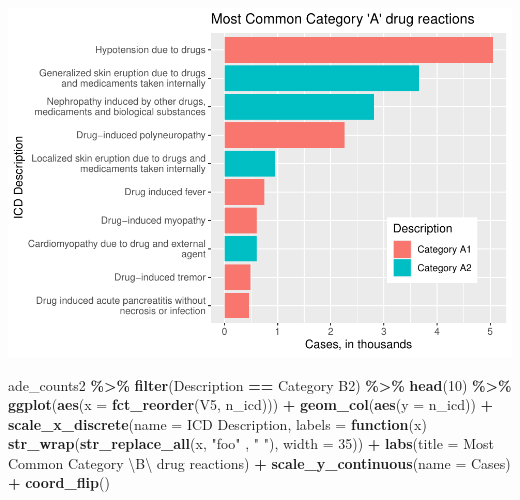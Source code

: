 \documentclass[preprint, 3p,
authoryear]{elsarticle} %
\newenvironment{Shaded}{\begin{snugshade}}{\end{snugshade}}
\newcommand{\CharTok}[1]{\textcolor[rgb]{0.31,0.60,0.02}{#1}}
\newcommand{\ControlFlowTok}[1]{\textcolor[rgb]{0.13,0.29,0.53}{\textbf{#1}}}
\newcommand{\DataTypeTok}[1]{\textcolor[rgb]{0.13,0.29,0.53}{#1}}
\newcommand{\DecValTok}[1]{\textcolor[rgb]{0.00,0.00,0.81}{#1}}
\newcommand{\KeywordTok}[1]{\textcolor[rgb]{0.13,0.29,0.53}{\textbf{#1}}}
\newcommand{\NormalTok}[1]{#1}
\newcommand{\OperatorTok}[1]{\textcolor[rgb]{0.81,0.36,0.00}{\textbf{#1}}}
\newcommand{\StringTok}[1]{\textcolor[rgb]{0.31,0.60,0.02}{#1}}
\begin{document}
\includegraphics{final-project-paper_files/figure-latex/top-10-ade-cat-ab-1.pdf}

\begin{Shaded}
\begin{Highlighting}[]
\NormalTok{ade\_counts2 }\OperatorTok{\%\textgreater{}\%}
\StringTok{  }\KeywordTok{filter}\NormalTok{(Description }\OperatorTok{==}\StringTok{ \textquotesingle{}Category B2\textquotesingle{}}\NormalTok{) }\OperatorTok{\%\textgreater{}\%}
\StringTok{  }\KeywordTok{head}\NormalTok{(}\DecValTok{10}\NormalTok{) }\OperatorTok{\%\textgreater{}\%}
\StringTok{  }\KeywordTok{ggplot}\NormalTok{(}\KeywordTok{aes}\NormalTok{(}\DataTypeTok{x =} \KeywordTok{fct\_reorder}\NormalTok{(V5, n\_icd))) }\OperatorTok{+}
\StringTok{  }\KeywordTok{geom\_col}\NormalTok{(}\KeywordTok{aes}\NormalTok{(}\DataTypeTok{y =}\NormalTok{ n\_icd)) }\OperatorTok{+}\StringTok{ }
\StringTok{  }\KeywordTok{scale\_x\_discrete}\NormalTok{(}\DataTypeTok{name =} \StringTok{\textquotesingle{}ICD Description\textquotesingle{}}\NormalTok{, }\DataTypeTok{labels =} \ControlFlowTok{function}\NormalTok{(x) }\KeywordTok{str\_wrap}\NormalTok{(}\KeywordTok{str\_replace\_all}\NormalTok{(x, }\StringTok{"foo"}\NormalTok{ , }\StringTok{" "}\NormalTok{),}
                                                 \DataTypeTok{width =} \DecValTok{35}\NormalTok{)) }\OperatorTok{+}
\StringTok{  }\KeywordTok{labs}\NormalTok{(}\DataTypeTok{title =} \StringTok{\textquotesingle{}Most Common Category }\CharTok{\textbackslash{}\textquotesingle{}}\StringTok{B}\CharTok{\textbackslash{}\textquotesingle{}}\StringTok{ drug reactions\textquotesingle{}}\NormalTok{) }\OperatorTok{+}
\StringTok{  }\KeywordTok{scale\_y\_continuous}\NormalTok{(}\DataTypeTok{name =} \StringTok{\textquotesingle{}Cases\textquotesingle{}}\NormalTok{) }\OperatorTok{+}
\StringTok{  }\KeywordTok{coord\_flip}\NormalTok{() }
\end{Highlighting}
\end{Shaded}
\end{document}
